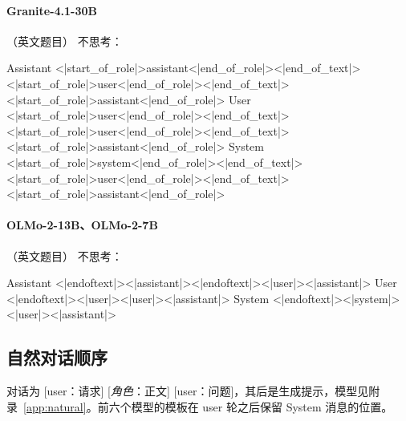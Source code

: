 \paragraph{Granite-4.1-30B} （英文题目）
\noindent 不思考：
\begin{Rendering}
Assistant  <|start_of_role|>assistant<|end_of_role|><|end_of_text|>\NL{}<|start_of_role|>user<|end_of_role|><|end_of_text|>\NL{}<|start_of_role|>assistant<|end_of_role|>
User       <|start_of_role|>user<|end_of_role|><|end_of_text|>\NL{}<|start_of_role|>user<|end_of_role|><|end_of_text|>\NL{}<|start_of_role|>assistant<|end_of_role|>
System     <|start_of_role|>system<|end_of_role|><|end_of_text|>\NL{}<|start_of_role|>user<|end_of_role|><|end_of_text|>\NL{}<|start_of_role|>assistant<|end_of_role|>
\end{Rendering}
\paragraph{OLMo-2-13B、OLMo-2-7B} （英文题目）
\noindent 不思考：
\begin{Rendering}
Assistant  <|endoftext|><|assistant|>\NL{}<|endoftext|>\NL{}<|user|>\NL{}\NL{}<|assistant|>\NL{}
User       <|endoftext|><|user|>\NL{}\NL{}<|user|>\NL{}\NL{}<|assistant|>\NL{}
System     <|endoftext|><|system|>\NL{}\NL{}<|user|>\NL{}\NL{}<|assistant|>\NL{}
\end{Rendering}

\subsection{自然对话顺序}
\label{app:templates_natural}

对话为 [user：请求] [\textit{角色}：正文] [user：问题]，其后是生成提示，模型见附录~\ref{app:natural}。前六个模型的模板在 user 轮之后保留 System 消息的位置。

